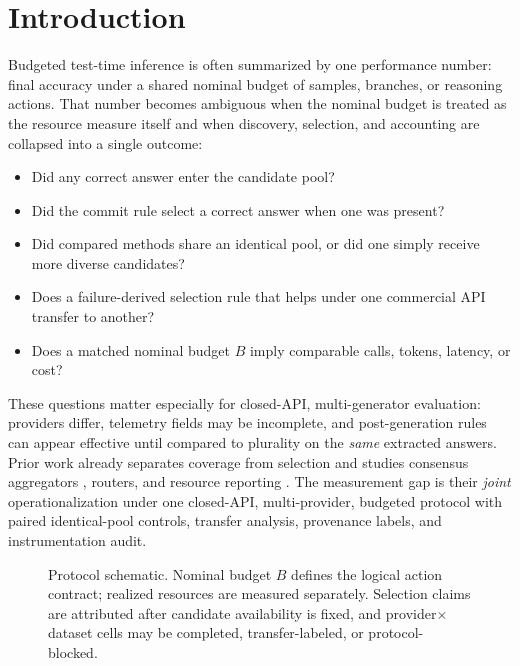 \section{Introduction}
\label{sec:intro}

Budgeted test-time inference is often summarized by one performance number: final accuracy under a
shared nominal budget of samples, branches, or reasoning actions. That number becomes ambiguous when
the nominal budget is treated as the resource measure itself and when discovery, selection, and
accounting are collapsed into a single outcome:
\begin{itemize}
\item Did any correct answer enter the candidate pool?
\item Did the commit rule select a correct answer when one was present?
\item Did compared methods share an identical pool, or did one simply receive more diverse
candidates?
\item Does a failure-derived selection rule that helps under one commercial API transfer to another?
\item Does a matched nominal budget $B$ imply comparable calls, tokens, latency, or cost?
\end{itemize}

These questions matter especially for closed-API, multi-generator evaluation: providers differ,
telemetry fields may be incomplete, and post-generation rules can appear effective until compared
to plurality on the \emph{same} extracted answers. Prior work already separates coverage from
selection and studies consensus aggregators
\citep{passatk,ll_monkeys,oracle_gap,selfconsistency}, routers, and resource reporting
\citep{snell_ttc}. The measurement gap is their
\emph{joint} operationalization under one closed-API, multi-provider, budgeted protocol with paired
identical-pool controls, transfer analysis, provenance labels, and instrumentation audit.

\begin{figure}[t]
\centering
\resizebox{\linewidth}{!}{}
\caption{Protocol schematic. Nominal budget $B$ defines the logical action contract; realized
resources are measured separately. Selection claims are attributed after candidate availability is
fixed, and provider$\times$dataset cells may be completed, transfer-labeled, or protocol-blocked.}
\label{fig:protocol}
\end{figure}

